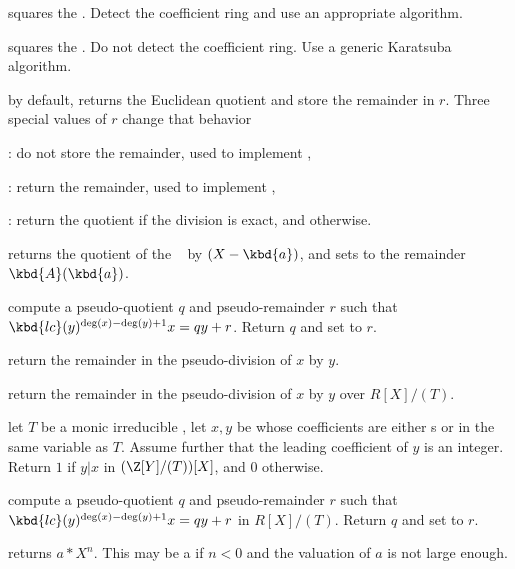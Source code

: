  squares the  . Detect the coefficient
ring and use an appropriate algorithm.

 squares the  . Do not detect the
coefficient ring.  Use a generic Karatsuba algorithm.

 by default, returns the Euclidean
quotient and store the remainder in $r$. Three special values of $r$ change
that behavior
\item {}: do not store the remainder, used to implement ,

\item {}: return the remainder, used to implement ,

\item {}: return the quotient if the division is exact, and
 otherwise.


 returns the
quotient of the ~ by $(X - \kbd{a})$, and sets  to the
remainder $\kbd{A}(\kbd{a})$.


 compute a pseudo-quotient
$q$ and pseudo-remainder $r$ such that $\kbd{lc}(y)^{\deg(x) - \deg(y) + 1}x
= qy + r$. Return $q$ and set  to $r$.

 return the remainder
in the pseudo-division of $x$ by $y$.

 return the remainder
in the pseudo-division of $x$ by $y$ over $R[X]/(T)$.

 let $T$ be a monic irreducible
, let $x, y$ be  whose coefficients are either s or
 in the same variable as $T$. Assume further that the leading
coefficient of $y$ is an integer. Return $1$ if $y | x$ in $(\Z[Y]/(T))[X]$,
and $0$ otherwise.

 compute
a pseudo-quotient $q$ and pseudo-remainder $r$ such that
$\kbd{lc}(y)^{\deg(x) - \deg(y) + 1}x = qy + r$ in $R[X]/(T)$. Return $q$ and
set  to $r$.

 returns $a * X^n$. This may
be a  if $n < 0$ and the valuation of $a$ is not large
enough.

